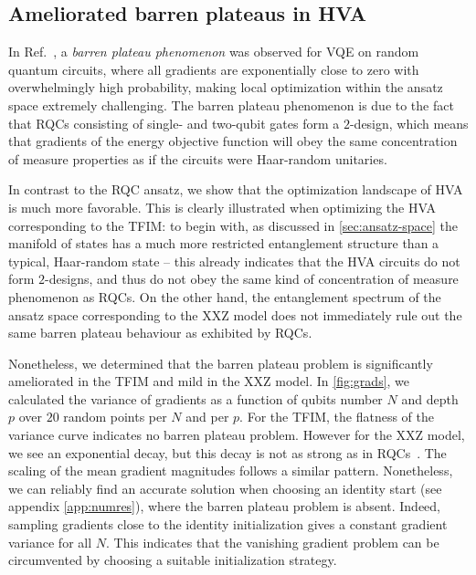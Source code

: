 \documentclass[
 aps,
 pra,
 showpacs,
 showkeys,
 superscriptaddress,
 reprint,%
twocolumn,
]{revtex4-1}
\begin{document}
\subsection{Ameliorated barren plateaus in HVA}\label{sec:nobarren}

In Ref.~\cite{McClean2018barren}, a \emph{barren plateau phenomenon} was observed for VQE on random quantum circuits, where all gradients are exponentially close to zero with overwhelmingly high probability, making local optimization within the ansatz space extremely challenging. The barren plateau phenomenon is due to the fact that RQCs consisting of single- and two-qubit gates form a $2$-design, which means that gradients of the energy objective function will obey the same concentration of measure properties as if the circuits were Haar-random unitaries. 


In contrast to the RQC ansatz, we show that the optimization landscape of HVA is much more favorable. This is clearly illustrated when optimizing the HVA corresponding to the TFIM: to begin with, as discussed in \cref{sec:ansatz-space} the manifold of states has a much more restricted entanglement structure than a typical, Haar-random state -- this already indicates that the HVA circuits do not form $2$-designs, and thus do not obey the same kind of concentration of measure phenomenon as RQCs. On the other hand, the entanglement spectrum of the ansatz space corresponding to the XXZ model does not immediately rule out the same barren plateau behaviour as exhibited by RQCs.


Nonetheless, we determined that the barren plateau problem is significantly ameliorated in the TFIM and mild in the XXZ model. In \cref{fig:grads}, we calculated the variance of gradients as a function of qubits number $N$ and depth $p$ over $20$ random points per $N$ and per $p$. For the TFIM, the flatness of the variance curve indicates no barren plateau problem. However for the XXZ model, we see an exponential decay, but this decay is not as strong as in RQCs~\cite{McClean2018barren}. The scaling of the mean gradient magnitudes follows a similar pattern. Nonetheless, we can reliably find an accurate solution when choosing an identity start (see appendix \cref{app:numres}), where the barren plateau problem is absent. Indeed, sampling gradients close to the identity initialization gives a constant gradient variance for all $N$. This indicates that the vanishing gradient problem can be circumvented by choosing a suitable initialization strategy.
\end{document}
